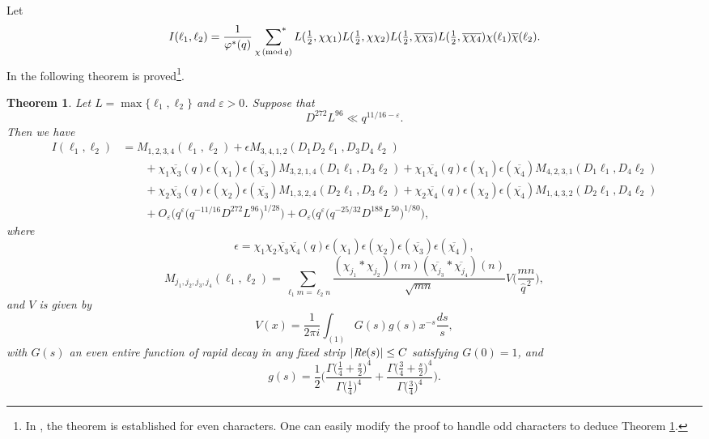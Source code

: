 \documentclass[12pt, reqno]{amsart}
\renewcommand{\pmod}[1]{\,(\mathrm{mod}\,#1)}
\newcommand{\acom}[1]{{\color{blue}{Alexandra: #1}} }
\newtheorem{theorem}{Theorem}
\numberwithin{equation}{section}
\numberwithin{theorem}{section}
\numberwithin{equation}{section}
\def\sumstar{\sideset{}{^*}\sum}
\begin{document}
Let
\begin{equation*}
I(\ell_1,\ell_2)=\frac{1}{\varphi^*(q)}\ \,   \sumstar_{\chi \pmod  q} L(\tfrac12,\chi\chi_1)L(\tfrac12,\chi\chi_2)L(\tfrac12,\overline{\chi\chi_3})L(\tfrac12,\overline{\chi\chi_4})\chi(\ell_1)\overline{\chi}(\ell_2).
\end{equation*}
In \cite[Theorem 1.3]{BFM} the following theorem is proved\footnote{In \cite[Theorem 1.3]{BFM}, the theorem is established for even characters. One can easily modify the proof to handle odd characters to deduce Theorem \ref{thmBFM}.}.

\begin{theorem}\label{thmBFM}
Let $L=\max\{\ell_1,\ell_2\}$ and $\varepsilon>0$. Suppose that
\[
D^{272}L^{96}\ll q^{11/16-\varepsilon}.
\]
Then we have
\begin{align*}
I(\ell_1,\ell_2)&=M_{1,2,3,4}(\ell_1,\ell_2)+ \epsilon M_{3,4,1,2}(D_1D_2\ell_1,D_3D_4\ell_2)\\
&\qquad+\chi_1\overline{\chi_3}(q)\epsilon(\chi_1)\epsilon(\overline{\chi_3})M_{3,2,1,4}(D_1\ell_1,D_3\ell_2) +\chi_1\overline{\chi_4}(q)\epsilon(\chi_1)\epsilon(\overline{\chi_4})M_{4,2,3,1}(D_1\ell_1,D_4\ell_2)\\
&\qquad+\chi_2\overline{\chi_3}(q)\epsilon(\chi_2)\epsilon(\overline{\chi_3})M_{1,3,2,4}(D_2\ell_1,D_3\ell_2)+\chi_2\overline{\chi_4}(q)\epsilon(\chi_2)\epsilon(\overline{\chi_4})M_{1,4,3,2}(D_2\ell_1,D_4\ell_2)\\
&\qquad+O_\varepsilon\Big(q^{\varepsilon}\big(q^{-11/16}D^{272}L^{96}\big)^{1/28}\Big)+O_\varepsilon\Big(q^{\varepsilon}\big(q^{-25/32}D^{188}L^{50}\big)^{1/80}\Big),
\end{align*}
where
\begin{equation*}
\epsilon=\chi_1\chi_2\overline{\chi_3}\overline{\chi_4}(q)\epsilon(\chi_1)\epsilon(\chi_2)\epsilon(\overline{\chi_3})\epsilon(\overline{\chi_4}),
\end{equation*}
\[
M_{j_1,j_2,j_3,j_4}(\ell_1,\ell_2)=\sum_{\ell_1m=\ell_2n}\frac{(\chi_{j_1}*\chi_{j_2})(m)(\overline{\chi_{j_3}}*\overline{\chi_{j_4}})(n)}{\sqrt{mn}}V\Big(\frac{mn}{\widehat{q}^{\,2}}\Big),
\]
 and $V$ is given by\begin{equation}\label{formulaV+}
V(x)=\frac{1}{2\pi i}\int_{(1)}G(s)g(s)x^{-s}\frac{ds}{s},
\end{equation} with
 $G(s)$ an even entire function of rapid decay in any fixed strip $|\emph{Re}(s)| \leq C$ satisfying $G(0)= 1$, and
\[g(s)=\frac{1}{2}\bigg(\frac{\Gamma\big(\frac14  +\frac{s}{2}\big)^4}{\Gamma\big(\frac{1}{4}\big)^4}+\frac{\Gamma\big(\frac34  +\frac{s}{2}\big)^4}{\Gamma\big(\frac{3}{4}\big)^4}\bigg).
\]
\end{theorem}
\end{document}
